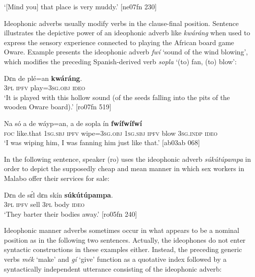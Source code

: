 \glt ‘[Mind you] that place is very muddy.’ [ne07fn 230]
\z

Ideophonic adverbs usually modify verbs in the clause-final position. Sentence  illustrates the depictive power of an ideophonic adverb like \textit{kwáráng} when used to express the sensory experience connected to playing the African board game Oware. Example  presents the ideophonic adverb \textit{fwí} ‘sound of the wind blowing’, which modifies the preceding Spanish-derived verb \textit{sopla} ‘(to) fan, (to) blow’: 


\ea%
    \label{ex:key:1630}
    \gll Dɛn  de  plé=an    \textbf{kwáráng}.\\
\textsc{3pl}  \textsc{ipfv}  play=\textsc{3sg.obj}  \textsc{ideo}\\

\glt ‘It is played with this hollow sound (of the seeds falling into the pits of the wooden Oware board).’ [ro07fn 519]
\z


\ea%
    \label{ex:key:1631}
    \gll Na  só    a    de  wáyp=an,  a    de  sopla  ín    \textbf{fwífwífwí}\\
\textsc{foc}  like.that  \textsc{1sg.sbj}  \textsc{ipfv}  wipe=\textsc{3sg.obj}  \textsc{1sg.sbj}  \textsc{ipfv}  blow  \textsc{3sg.indp}  \textsc{ideo}\\

\glt ‘I was wiping him, I was fanning him just like that.’ [ab03ab 068]
\z

In the following sentence, speaker (ro) uses the ideophonic adverb \textit{súkútúpampa} in order to depict the supposedly cheap and mean manner in which sex workers in Malabo offer their services for sale: 


\ea%
    \label{ex:key:1632}
    \gll Dɛn  de  sɛ́l  dɛn  skín    \textbf{súkútúpampa}.\\
\textsc{3pl}  \textsc{ipfv}  sell  \textsc{3pl}  body  \textsc{ideo}\\

\glt ‘They barter their bodies away.’ [ro05fn 240]
\z

Ideophonic manner adverbs sometimes occur in what appears to be a nominal position as in the following two sentences. Actually, the ideophones do not enter syntactic constructions in these examples either. Instead, the preceding generic verbs \textit{mék} ‘make’ and \textit{gí} ‘give’ function as a quotative index followed by a syntactically independent utterance consisting of the ideophonic adverb: 


